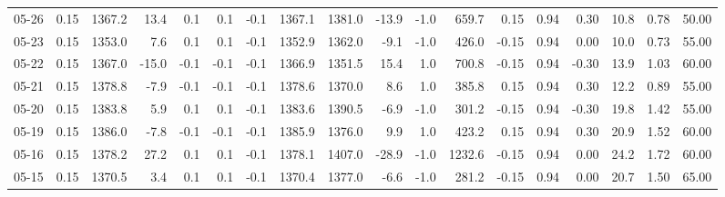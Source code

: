 \begin{threeparttable}
{\begin{tabular}{lrrrrrrrrrrrrrrrrr}
  05-26 &     0.15 & 1367.2 &              13.4 &               0.1 &                0.1 &               -0.1 & 1367.1 & 1381.0 &      -13.9 &                     -1.0 &               659.7 &       0.15 &      0.94 &           0.30 &             10.8 &            0.78 &                  50.00 \\
  05-23 &     0.15 & 1353.0 &               7.6 &               0.1 &                0.1 &               -0.1 & 1352.9 & 1362.0 &       -9.1 &                     -1.0 &               426.0 &      -0.15 &      0.94 &           0.00 &             10.0 &            0.73 &                  55.00 \\
  05-22 &     0.15 & 1367.0 &             -15.0 &              -0.1 &               -0.1 &               -0.1 & 1366.9 & 1351.5 &       15.4 &                      1.0 &               700.8 &      -0.15 &      0.94 &          -0.30 &             13.9 &            1.03 &                  60.00 \\
  05-21 &     0.15 & 1378.8 &              -7.9 &              -0.1 &               -0.1 &               -0.1 & 1378.6 & 1370.0 &        8.6 &                      1.0 &               385.8 &       0.15 &      0.94 &           0.30 &             12.2 &            0.89 &                  55.00 \\
  05-20 &     0.15 & 1383.8 &               5.9 &               0.1 &                0.1 &               -0.1 & 1383.6 & 1390.5 &       -6.9 &                     -1.0 &               301.2 &      -0.15 &      0.94 &          -0.30 &             19.8 &            1.42 &                  55.00 \\
  05-19 &     0.15 & 1386.0 &              -7.8 &              -0.1 &               -0.1 &               -0.1 & 1385.9 & 1376.0 &        9.9 &                      1.0 &               423.2 &       0.15 &      0.94 &           0.30 &             20.9 &            1.52 &                  60.00 \\
  05-16 &     0.15 & 1378.2 &              27.2 &               0.1 &                0.1 &               -0.1 & 1378.1 & 1407.0 &      -28.9 &                     -1.0 &              1232.6 &      -0.15 &      0.94 &           0.00 &             24.2 &            1.72 &                  60.00 \\
  05-15 &     0.15 & 1370.5 &               3.4 &               0.1 &                0.1 &               -0.1 & 1370.4 & 1377.0 &       -6.6 &                     -1.0 &               281.2 &      -0.15 &      0.94 &           0.00 &             20.7 &            1.50 &                  65.00 \\

\end{tabular}}
\end{threeparttable}
